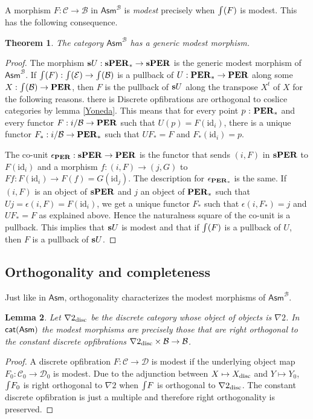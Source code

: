 \documentclass{amsart}
\theoremstyle{plain}
\newtheorem{theorem}{Theorem}
\newtheorem{lemma}[theorem]{Lemma}
\theoremstyle{definition}
\newcommand\hide[1]{}
\newcommand\cat\mathcal
\newcommand\id{\mathrm{id}}
\newcommand\Asm{\mathsf{Asm}}
\begin{document}
A morphism $F:\cat C \to\cat B$ in $\Asm^\cat B$ is \emph{modest} precisely when $\mathord{\int}(F)$ is modest. This has the following consequence.

\begin{theorem} The category $\Asm^\cat B$ has a generic modest morphism. \label{genmod} \end{theorem}

\begin{proof} The morphism $\mathbf{s} U:\mathbf{s}\mathbf{PER}_* \to\mathbf{s}\mathbf{PER}$ is the generic modest morphism of $\Asm^{\cat B}$. If $\tot(F):\tot(\cat E) \to \tot(\cat B)$ is a pullback of $U:\mathbf{PER}_*\to\mathbf{PER}$ along some $X:\tot(\cat B) \to \cat \pers$, then $F$ is the pullback of $\mathbf{s} U$ along the transpose $X^t$ of $X$ for the following reasons.
there is
Discrete opfibrations are orthogonal to coslice categories by lemma \ref{Yoneda}. This means that for every point $p\mathord{\ :\ } \mathbf{PER}_*$ and every functor $F:i/\cat B\to\pers$ such that $U(p) = F(\id_i)$, there is a unique functor $F_*:i/\cat B\to\pers_*$ such that $UF_* = F$ and $F_*(\id_i) = p$.

The co-unit $\epsilon_{\mathbf{PER}}: \mathbf{s} \mathbf{PER} \to \mathbf{PER}$ is the functor that sends $(i,F)$ in $\mathbf{s} \mathbf{PER}$ to $F(\id_i)$ and a morphism $f:(i,F) \to (j,G)$ to $Ff:F(\id_i) \to F(f)=G(\id_j)$. The description for $\epsilon_{\mathbf{PER}_*}$ is the same. If $(i,F)$ is an object of $\mathbf{s} \mathbf{PER}$ and $j$ an object of $\mathbf{PER}_*$ such that $Uj = \epsilon(i,F) = F(\id_i)$, we get a unique functor $F_*$ such that $\epsilon(i,F_*) = j$ and $UF_* = F$ as explained above. Hence the naturalness square of the co-unit is a pullback. This implies that $\mathbf{s} U$ is modest and that if $\mathord{\int}(F)$ is a pullback of $U$, then $F$ is a pullback of $\mathbf{s} U$.
\end{proof}

\subsection{Orthogonality and completeness}
Just like in $\Asm$, orthogonality characterizes the modest morphisms of $\Asm^{\cat B}$.

\newcommand\disc{_{\rm disc}}
\begin{lemma} Let $\nabla 2\disc$ be the discrete category whose object of objects is $\nabla 2$. In $\mathsf{cat(Asm)}$ the modest morphisms are precisely those that are right orthogonal to the constant discrete opfibrations $\nabla 2\disc \times\cat B \to\cat B$. \end{lemma}

\hide{\tot preserves discrete opfibrations. Can't we use that?}
\begin{proof} A discrete opfibration $F:\cat C\to\cat D$ is modest if the underlying object map $F_0:\cat C_0 \to \cat D_0$ is modest. Due to the adjunction between $X\mapsto X\disc$ and $Y\mapsto Y_0$, $\mathord{\int} F_0$ is right orthogonal to $\nabla 2$ when $\mathord{\int} F$ is orthogonal to $\nabla 2\disc$. The constant discrete opfibration is just a multiple and therefore right orthogonality is preserved.
\end{proof}
\end{document}
